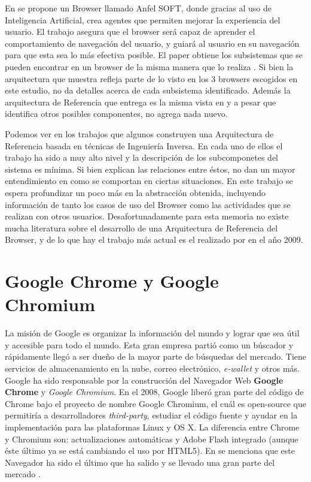 En \cite{Lwin2009} se propone un Browser llamado Anfel SOFT, donde gracias al uso de Inteligencia Artificial, crea agentes que permiten mejorar la experiencia del usuario. El trabajo asegura que el browser será capaz de aprender el comportamiento de navegación del usuario, y guiará al usuario en su navegación para que esta sea lo más efectiva posible. El paper obtiene los subsistemas que se pueden encontrar en un browser de la misma manera que lo realiza \cite{2005-grosskurth-browser-refarch}. Si bien la arquitectura que muestra refleja parte de lo visto en los 3 browsers escogidos en este estudio, no da detalles acerca de cada subsistema identificado. Además la arquitectura de Referencia que entrega es la misma vista en \cite{2005-grosskurth-browser-refarch, preprint-grosskurth-browser-archevol} y a pesar que identifica otros posibles componentes, no agrega nada nuevo.

Podemos ver en los trabajos que algunos construyen una Arquitectura de Referencia basada en técnicas de Ingeniería Inversa. En cada uno de ellos el trabajo ha sido a muy alto nivel y la descripción de los subcomponetes del sistema es mínima. Si bien explican las relaciones entre éstos, no dan un mayor entendimiento en como se comportan en ciertas situaciones. En este trabajo se espera profundizar un poco más en la abstracción obtenida, incluyendo información de tanto los casos de uso del Browser como las actividades que se realizan con otros usuarios. Desafortunadamente para esta memoria no existe mucha literatura sobre el desarrollo de una Arquitectura de Referencia del Browser, y de lo que hay el trabajo más actual es el realizado por \cite{Lwin2009} en el año 2009.


\section{Google Chrome y Google Chromium}
    \label{chap3:GC}
    La misión de Google es organizar la información del mundo y lograr que sea útil y accesible para todo el mundo. Esta gran empresa partió como un búscador y rápidamente llegó a ser dueño de la mayor parte de búsquedas del mercado. Tiene servicios de almacenamiento en la nube, correo electrónico, \textit{e-wallet} y otros más. Google ha sido responsable por la construcción del Navegador Web \textbf{Google Chrome} y \textit{Google Chromium}. En el 2008, Google liberó gran parte del código de Chrome bajo el proyecto de nombre Google Chromium, el cuál es open-source que permitiría a desarrolladores \textit{third-party}, estudiar el código fuente y ayudar en la implementación para las plataformas Linux y OS X. La diferencia entre Chrome y Chromium son: actualizaciones automáticas y Adobe Flash integrado (aunque éste último ya se está cambiando el uso por HTML5). En  \cite{EvolutionofWeb} se menciona que este Navegador ha sido el último que ha salido y se llevado una gran parte del mercado \cite{statBrow}.

